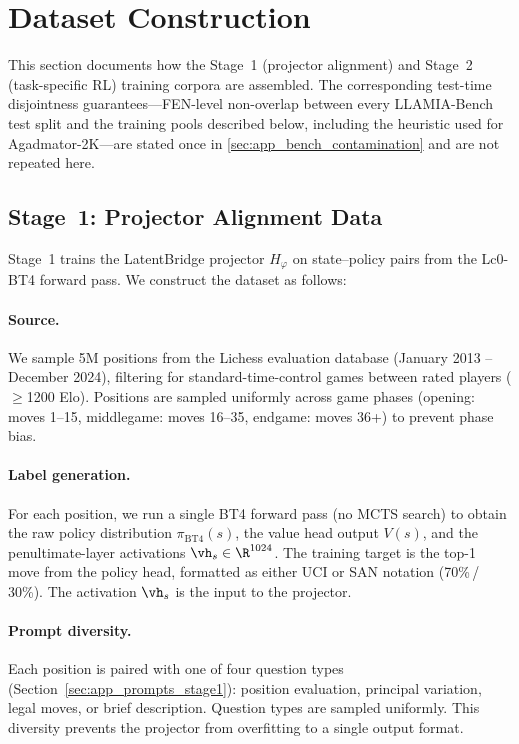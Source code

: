 \section{Dataset Construction}
\label{sec:app_data}

This section documents how the Stage~1 (projector alignment) and Stage~2 (task-specific RL) training corpora are assembled. The corresponding test-time disjointness guarantees---FEN-level non-overlap between every LLAMIA-Bench test split and the training pools described below, including the heuristic used for Agadmator-2K---are stated once in \cref{sec:app_bench_contamination} and are not repeated here.

\subsection{Stage~1: Projector Alignment Data}
\label{sec:app_data_stage1}


Stage~1 trains the LatentBridge projector $H_\varphi$ on state--policy pairs from the Lc0-BT4 forward pass. We construct the dataset as follows:

\paragraph{Source.} We sample 5M positions from the Lichess evaluation database (January 2013 -- December 2024), filtering for standard-time-control games between rated players ($\geq$1200 Elo). Positions are sampled uniformly across game phases (opening: moves 1--15, middlegame: moves 16--35, endgame: moves 36+) to prevent phase bias.

\paragraph{Label generation.} For each position, we run a single BT4 forward pass (no MCTS search) to obtain the raw policy distribution $\pi_\text{BT4}(s)$, the value head output $V(s)$, and the penultimate-layer activations $\vh_s \in \R^{1024}$. The training target is the top-1 move from the policy head, formatted as either UCI or SAN notation (70\%\,/\,30\%). The activation $\vh_s$ is the input to the projector.

\paragraph{Prompt diversity.} Each position is paired with one of four question types (Section~\ref{sec:app_prompts_stage1}): position evaluation, principal variation, legal moves, or brief description. Question types are sampled uniformly. This diversity prevents the projector from overfitting to a single output format.

